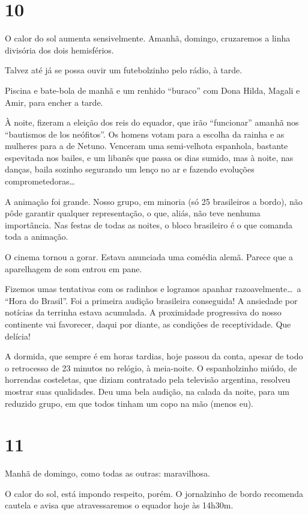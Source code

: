 \section*{10 \adfflatleafright {}}
O calor do sol aumenta sensivelmente. Amanhã, domingo, cruzaremos a linha divisória dos dois hemisférios.

Talvez até já se possa ouvir um futebolzinho pelo rádio, à tarde.

Piscina e bate-bola de manhã e um renhido ``buraco'' com Dona Hilda, Magali e Amir, para encher a tarde.

À noite, fizeram a eleição dos reis do equador, que irão ``funcionar'' amanhã nos ``bautismos de los neófitos''. Os homens votam para a escolha da rainha e as mulheres para a de Netuno. Venceram uma semi-velhota espanhola, bastante espevitada nos bailes, e um libanês que passa os dias sumido, mas à noite, nas danças, baila sozinho segurando um lenço no ar e fazendo evoluções comprometedoras\ldots

A animação foi grande. Nosso grupo, em minoria (só 25 brasileiros a bordo), não pôde garantir qualquer representação, o que, aliás, não teve nenhuma importância. Nas festas de todas as noites, o bloco brasileiro é o que comanda toda a animação.

O cinema tornou a gorar. Estava anunciada uma comédia alemã. Parece que a aparelhagem de som entrou em pane.

Fizemos umas tentativas com os radinhos e logramos apanhar razoavelmente\ldots\ a ``Hora do Brasil''. Foi a primeira audição brasileira conseguida! A ansiedade por notícias da terrinha estava acumulada. A proximidade progressiva do nosso continente vai favorecer, daqui por diante, as condições de receptividade. Que delícia!

A dormida, que sempre é em horas tardias, hoje passou da conta, apesar de todo o retrocesso de 23 minutos no relógio, à meia-noite. O espanholzinho miúdo, de horrendas costeletas, que diziam contratado pela televisão argentina, resolveu mostrar suas qualidades. Deu uma bela audição, na calada da noite, para um reduzido grupo, em que todos tinham um copo na mão (menos eu).

\section*{11 \adfflatleafright {}}
Manhã de domingo, como todas as outras: maravilhosa.

O calor do sol, está impondo respeito, porém. O jornalzinho de bordo recomenda cautela e avisa que atravessaremos o equador hoje às 14h30m.

